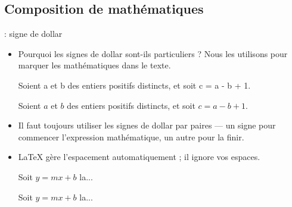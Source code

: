 \documentclass{beamer}
\begin{document}
\subsection{Composition de mathématiques}
\begin{frame}[fragile]{\insertsubsection{}: signe de dollar}
\begin{itemize}
\item Pourquoi les signes de dollar \keystrokebftt{\$} sont-ils particuliers ? Nous les utilisons pour marquer les mathématiques dans le texte.\\[1ex]
\begin{exampletwouptiny}
Soient a et b des entiers positifs
distincts, et soit c = a - b + 1.

Soient $a$ et $b$ des entiers positifs
distincts, et soit $c = a - b + 1$.
\end{exampletwouptiny}
\item Il faut toujours utiliser les signes de dollar par paires --- un signe pour commencer l'expression mathématique, un autre pour la finir.
\item \LaTeX{} gère l'espacement automatiquement ; il ignore vos espaces.
\begin{exampletwouptiny}
Soit $y=mx+b$ la...

Soit $y = m x + b$ la...
\end{exampletwouptiny}
\end{itemize}
\end{frame}
\end{document}

